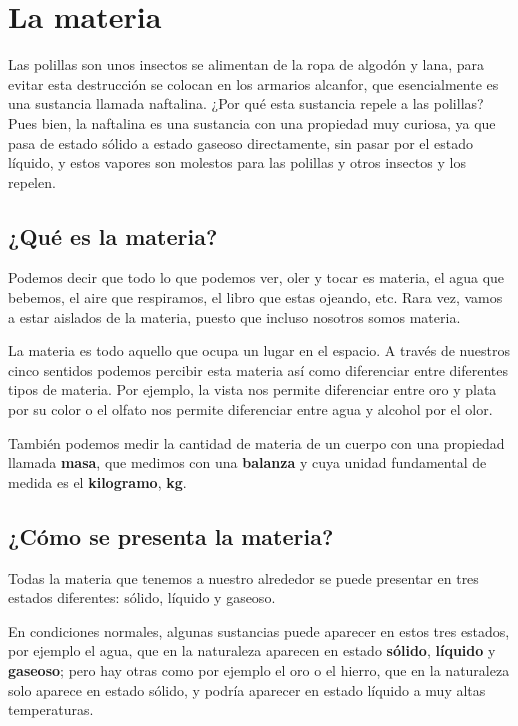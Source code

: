 \chapter{La materia}

Las polillas son unos insectos se alimentan de la ropa de algodón y lana, para evitar esta destrucción se colocan en los armarios alcanfor, que esencialmente es una sustancia llamada naftalina. ¿Por qué esta sustancia repele a las polillas? Pues bien, la naftalina es una sustancia con una propiedad muy curiosa, ya que pasa de estado sólido a estado gaseoso directamente, sin pasar por el estado líquido, y estos vapores son molestos para las polillas y otros insectos y los repelen.


\section{¿Qué es la materia?}

Podemos decir que todo lo que podemos ver, oler y tocar es materia, el agua que bebemos, el aire que respiramos, el libro que estas ojeando, etc. Rara vez, vamos a estar aislados de la materia, puesto que incluso nosotros somos materia. 

La materia es todo aquello que ocupa un lugar en el espacio. A través de nuestros cinco sentidos podemos percibir esta materia así como diferenciar entre diferentes tipos de materia. Por ejemplo, la vista nos permite diferenciar entre oro y plata por su color o el olfato nos permite diferenciar entre agua y alcohol por el olor.

También podemos medir la cantidad de materia de un cuerpo con una propiedad llamada \textbf{masa}, que medimos con una \textbf{balanza} y cuya unidad fundamental de medida es el \textbf{kilogramo}, \textbf{kg}.


\section{¿Cómo se presenta la materia?}

Todas la materia que tenemos a nuestro alrededor se puede presentar en tres estados diferentes: sólido, líquido y gaseoso. 

En condiciones normales, algunas sustancias puede aparecer en estos tres estados, por ejemplo el agua, que en la naturaleza aparecen en estado \textbf{sólido}, \textbf{líquido} y \textbf{gaseoso}; pero hay otras como por ejemplo el oro o el hierro, que en la naturaleza solo aparece en estado sólido, y podría aparecer en estado líquido a muy altas temperaturas.

